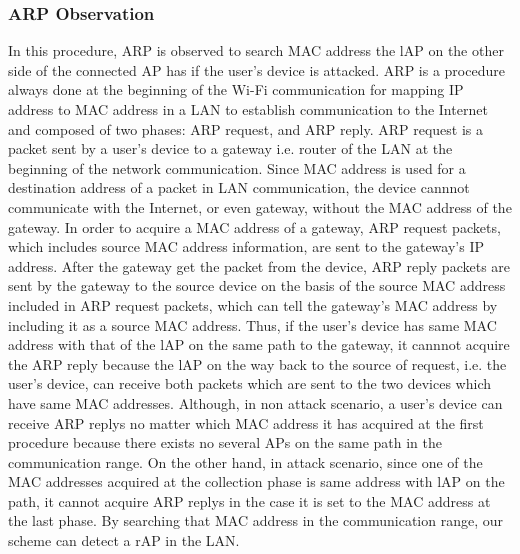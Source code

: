 \documentclass[conference]{IEEEtran}
\begin{document}
\subsubsection{ARP Observation}
In this procedure, ARP is observed to search MAC address the lAP on the other side of the connected AP has if the user's device is attacked.
ARP is a procedure always done at the beginning of the Wi-Fi communication for mapping IP address to MAC address in a LAN to establish communication to the Internet and composed of two phases: ARP request, and ARP reply.
ARP request is a packet sent by a user's device to a gateway i.e. router of the LAN at the beginning of the network communication.
Since MAC address is used for a destination address of a packet in LAN communication, the device cannnot communicate with the Internet, or even gateway, without the MAC address of the gateway.
In order to acquire a MAC address of a gateway, ARP request packets, which includes source MAC address information, are sent to the gateway's IP address. 
After the gateway get the packet from the device, ARP reply packets are sent by the gateway to the source device on the basis of the source MAC address included in ARP request packets, which can tell the gateway's MAC address by including it as a source MAC address.
Thus, if the user's device has same MAC address with that of the lAP on the same path to the gateway, it cannnot acquire the ARP reply because the lAP on the way back to the source of request, i.e. the user's device, can receive both packets which are sent to the two devices which have same MAC addresses.
Although, in non attack scenario, a user's device can receive ARP replys no matter which MAC address it has acquired at the first procedure because there exists no several APs on the same path in the communication range.
On the other hand, in attack scenario, since one of the MAC addresses acquired at the collection phase is same address with lAP on the path, it cannot acquire ARP replys in the case it is set to the MAC address at the last phase.
By searching that MAC address in the communication range, our scheme can detect a rAP in the LAN. 
\end{document}

